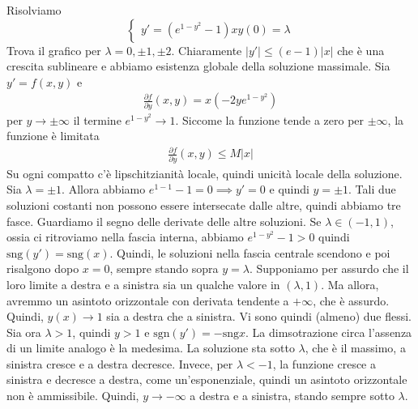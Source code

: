 \documentclass[a4paper]{article}
\begin{document}
\begin{snippetexercise}{}
    Risolviamo
    \[
        \begin{cases}
            y' = \left(e^{1-y^2} - 1\right)x
            y(0) = \lambda
        \end{cases}
    \]
    Trova il grafico per \(\lambda = 0, \pm 1, \pm 2\).
    Chiaramente \(|y'| \leq (e -1)|x|\) che è una crescita sublineare
    e abbiamo esistenza globale della soluzione massimale.
    Sia \(y' = f(x,y)\) e
    \begin{align*}
        \frac{\partial f}{\partial y}(x,y) = x \left(
            -2ye^{1-y^2}
        \right)
    \end{align*}
    per \(y\to\pm\infty\) il termine \(e^{1-y^2} \to 1\).
    Siccome la funzione tende a zero per \(\pm\infty\),
    la funzione è limitata
    \begin{align*}
        \frac{\partial f}{\partial y}(x,y) \leq M|x|
    \end{align*}
    Su ogni compatto c'è lipschitzianità locale, quindi unicità locale
    della soluzione.
    Sia \(\lambda = \pm 1\). Allora abbiamo \(e^{1-1} -1 = 0 \implies y'=0\)
    e quindi \(y = \pm 1\).
    Tali due soluzioni costanti non possono essere intersecate dalle altre,
    quindi abbiamo tre fasce. Guardiamo il segno delle derivate delle altre soluzioni.
    Se \(\lambda \in (-1,1)\), ossia ci ritroviamo nella fascia interna,
    abbiamo \(e^{1-y^2}-1 > 0\) quindi \(\text{sng}(y') = \text{sng}(x)\).
    Quindi, le soluzioni nella fascia centrale scendono e poi risalgono dopo \(x=0\),
    sempre stando sopra \(y = \lambda\). Supponiamo per assurdo che il loro limite a destra e a sinistra
    sia un qualche valore in \((\lambda, 1)\). Ma allora, avremmo un asintoto orizzontale
    con derivata tendente a \(+\infty\), che è assurdo. %
    Quindi, \(y(x) \to 1\) sia a destra che a sinistra. Vi sono quindi
    (almeno) due flessi.
    Sia ora \(\lambda > 1\), quindi \(y>1\) e
    \(\text{sgn}(y') = -\text{sng}x\). La dimsotrazione circa l'assenza di un limite
    analogo è la medesima. La soluzione sta sotto \(\lambda\), che è il massimo,
    a sinistra cresce e a destra decresce.
    Invece, per \(\lambda < -1\), la funzione cresce a sinistra e decresce a destra, come un'esponenziale,
    quindi un asintoto orizzontale non è ammissibile.
    Quindi, \(y \to -\infty\) a destra e a sinistra, stando sempre sotto \(\lambda\).
\end{snippetexercise}

\end{document}
